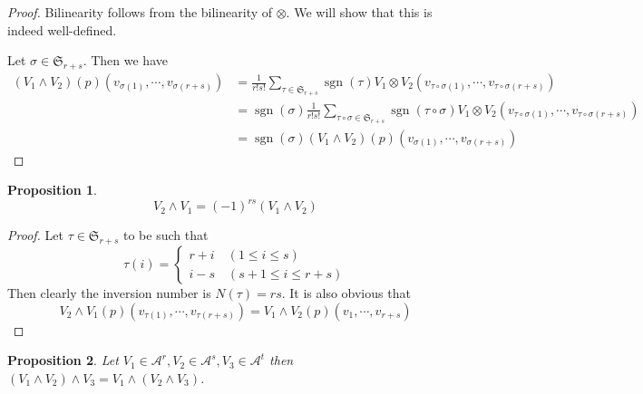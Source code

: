 \documentclass{article}
\newtheorem{proposition}{Proposition}[section]
\numberwithin{equation}{section}
\DeclareMathOperator{\sgn}{sgn}
\begin{document}
\begin{proof}
Bilinearity follows from the bilinearity of $\otimes$. We will show that this is indeed well-defined.\\
\par Let $\sigma\in\mathfrak{S}_{r+s}$. Then we have
\begin{align*}
(V_1\wedge V_2)(p)(v_{\sigma(1)},\cdots,v_{\sigma(r+s)}) & = {\frac 1 {r!s!}}\sum_{\tau\in\mathfrak{S}_{r+s}}\sgn(\tau)V_1\otimes V_2(v_{\tau\circ\sigma(1)},\cdots,v_{\tau\circ\sigma(r+s)})\\
&=  \sgn(\sigma){\frac 1 {r!s!}}\sum_{\tau\circ\sigma\in\mathfrak{S}_{r+s}}\sgn(\tau\circ\sigma)V_1\otimes V_2(v_{\tau\circ\sigma(1)},\cdots,v_{\tau\circ\sigma(r+s)})\\
&=\sgn(\sigma)(V_1\wedge V_2)(p)(v_{\sigma(1)},\cdots,v_{\sigma(r+s)})
\end{align*}
\end{proof}

\begin{proposition}
\begin{equation*}
V_2\wedge V_1 = (-1)^{rs}(V_1\wedge V_2)
\end{equation*}
\end{proposition}
\begin{proof}
Let $\tau\in\mathfrak{S}_{r+s}$ to be such that
\begin{equation*}
\tau(i) = 
\begin{cases}
r+i \quad (1\leq i \leq s)\\
i-s\quad(s+1\leq i \leq r+s)
\end{cases}
\end{equation*}
Then clearly the inversion number is $N(\tau)=rs$. It is also obvious that
\begin{equation*}
V_2\wedge V_1(p)(v_{\tau(1)},\cdots,v_{\tau(r+s)}) = V_1\wedge V_2(p)(v_1,\cdots,v_{r+s})
\end{equation*}
\end{proof}

\begin{proposition}
Let $V_1\in\mathcal{A}^r,V_2\in\mathcal{A}^s,V_3\in\mathcal{A}^t$ then $(V_1\wedge V_2)\wedge V_3=V_1\wedge(V_2\wedge V_3)$.
\end{proposition}
\end{document}
